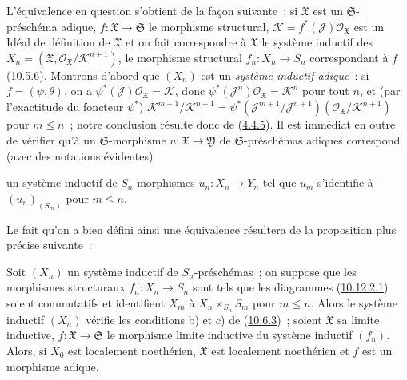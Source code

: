 L'équivalence en question s'obtient de la façon suivante~: si
$\mathfrak{X}$ est un $\mathfrak{S}$-préschéma adique,
$f:\mathfrak{X}\to\mathfrak{S}$ le morphisme structural,
$\mathscr{K}=f^*(\mathscr{J})\mathscr{O}_{\mathfrak{X}}$ est un Idéal de
définition de $\mathfrak{X}$ et on fait correspondre à $\mathfrak{X}$ le
système inductif des
$X_n=(\mathfrak{X},\mathscr{O}_{\mathfrak{X}}/\mathscr{K}^{n+1})$, le
morphisme structural $f_n:X_n\to S_n$ correspondant à $f$
(\hyperref[I.10.5.6-fr]{10.5.6}). Montrons d'abord que $(X_n)$ est un
\emph{système inductif adique}~: si $f=(\psi,\theta)$, on a
$\psi^*(\mathscr{J})\mathscr{O}_{\mathfrak{X}}=\mathscr{K}$, donc
$\psi^*(\mathscr{J}^n)\mathscr{O}_{\mathfrak{X}}=\mathscr{K}^n$ pour tout
$n$, et (par l'exactitude du foncteur $\psi^*$)
$\mathscr{K}^{m+1}/\mathscr{K}^{n+1}
=\psi^*(\mathscr{J}^{m+1}/\mathscr{J}^{n+1})
(\mathscr{O}_{\mathfrak{X}}/\mathscr{K}^{n+1})$ pour $m\leq n$~; notre
conclusion résulte donc de (\hyperref[I.4.4.5-fr]{4.4.5}). Il est immédiat
en outre de vérifier qu'à un $\mathfrak{S}$-morphisme
$u:\mathfrak{X}\to\mathfrak{Y}$ de $\mathfrak{S}$-préschémas adiques
correspond (avec des notations évidentes)


un système inductif de $S_n$-morphismes $u_n:X_n\to Y_n$ tel que $u_m$
s'identifie à $(u_n)_{(S_m)}$ pour $m\leq n$.

Le fait qu'on a bien défini ainsi une équivalence résultera de la proposition
plus précise suivante~:

\begin{proposition}[10.12.3.1]
\label{I.10.12.3.1-fr}
Soit $(X_n)$ un système inductif de $S_n$-préschémas~; on suppose que les
morphismes structuraux $f_n:X_n\to S_n$ sont tels que les diagrammes
(\hyperref[I.10.12.2.1-fr]{10.12.2.1}) soient commutatifs et identifient
$X_m$ à $X_n\times_{S_n}S_m$ pour $m\leq n$. Alors le système inductif
$(X_n)$ vérifie les conditions b) et c) de
(\hyperref[I.10.6.3-fr]{10.6.3})~; soient $\mathfrak{X}$ sa limite inductive,
$f:\mathfrak{X}\to\mathfrak{S}$ le morphisme limite inductive du système
inductif $(f_n)$. Alors, si $X_0$ est localement noethérien,
$\mathfrak{X}$ est localement noethérien et $f$ est un morphisme adique.
\end{proposition}

